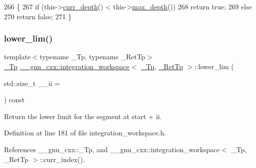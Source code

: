 \begin{DoxyCode}
266       \{
267         \textcolor{keywordflow}{if} (this->\hyperlink{class____gnu__cxx_1_1integration__workspace_ad60321be84f0301856bf20f31ece47de}{curr\_depth}() < this->\hyperlink{class____gnu__cxx_1_1integration__workspace_a18115495f63c8a3fc27205cad0ba8869}{max\_depth}())
268           \textcolor{keywordflow}{return} \textcolor{keyword}{true};
269         \textcolor{keywordflow}{else}
270           \textcolor{keywordflow}{return} \textcolor{keyword}{false};
271       \}
\end{DoxyCode}
\mbox{\label{class____gnu__cxx_1_1integration__workspace_af8ae8a6ff41b7d7b38aee63ccca6b458}} 
\subsubsection{\texorpdfstring{lower\+\_\+lim()}{lower\_lim()}}
{\footnotesize\ttfamily template$<$typename \+\_\+\+Tp, typename \+\_\+\+Ret\+Tp$>$ \\
\hyperlink{namespace____gnu__cxx_a3b19a9c800ca194374ef9172290f7d79}{\+\_\+\+Tp} \hyperlink{class____gnu__cxx_1_1integration__workspace}{\+\_\+\+\_\+gnu\+\_\+cxx\+::integration\+\_\+workspace}$<$ \hyperlink{namespace____gnu__cxx_a3b19a9c800ca194374ef9172290f7d79}{\+\_\+\+Tp}, \hyperlink{namespace____gnu__cxx_a886e03ece3d53ff7fa6c098a40f93fa5}{\+\_\+\+Ret\+Tp} $>$\+::lower\+\_\+lim (\begin{DoxyParamCaption}\item[{std\+::size\+\_\+t}]{\+\_\+\+\_\+ii = {} }\end{DoxyParamCaption}) const\hspace{0.3cm}{\ttfamily [inline]}}

Return the lower limit for the segment at start + ii. 

Definition at line 181 of file integration\+\_\+workspace.\+h.



References \+\_\+\+\_\+gnu\+\_\+cxx\+::\+\_\+\+Tp, and \+\_\+\+\_\+gnu\+\_\+cxx\+::integration\+\_\+workspace$<$ \+\_\+\+Tp, \+\_\+\+Ret\+Tp $>$\+::curr\+\_\+index().


